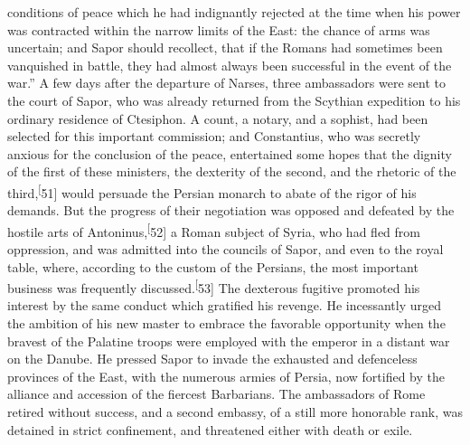 conditions of peace which he had indignantly rejected at the time
when his power was contracted within the narrow limits of the
East: the chance of arms was uncertain; and Sapor should
recollect, that if the Romans had sometimes been vanquished in
battle, they had almost always been successful in the event of
the war.” A few days after the departure of Narses, three
ambassadors were sent to the court of Sapor, who was already
returned from the Scythian expedition to his ordinary residence
of Ctesiphon. A count, a notary, and a sophist, had been selected
for this important commission; and Constantius, who was secretly
anxious for the conclusion of the peace, entertained some hopes
that the dignity of the first of these ministers, the dexterity
of the second, and the rhetoric of the third,\textsuperscript[51] would persuade
the Persian monarch to abate of the rigor of his demands. But the
progress of their negotiation was opposed and defeated by the
hostile arts of Antoninus,\textsuperscript[52] a Roman subject of Syria, who had
fled from oppression, and was admitted into the councils of
Sapor, and even to the royal table, where, according to the
custom of the Persians, the most important business was
frequently discussed.\textsuperscript[53] The dexterous fugitive promoted his
interest by the same conduct which gratified his revenge. He
incessantly urged the ambition of his new master to embrace the
favorable opportunity when the bravest of the Palatine troops
were employed with the emperor in a distant war on the Danube. He
pressed Sapor to invade the exhausted and defenceless provinces
of the East, with the numerous armies of Persia, now fortified by
the alliance and accession of the fiercest Barbarians. The
ambassadors of Rome retired without success, and a second
embassy, of a still more honorable rank, was detained in strict
confinement, and threatened either with death or exile.





